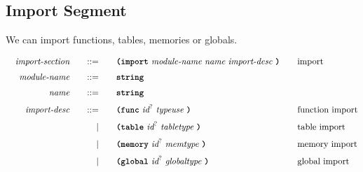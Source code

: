 \subsection{Import Segment}

We can import functions, tables, memories or globals.

\begin{alignat*}{9}
    && \textit{import-section}    &&\quad ::= &\quad && \textbf{\texttt{(import}}\ \textit{module-name}\ \textit{name}\ \textit{import-desc}\ \textbf{\texttt{)}}  \quad && \textrm{import} \\[1mm]
    && \textit{module-name}       &&\quad ::= &\quad && \textbf{\texttt{string}} &&\\[1mm]
    && \textit{name}              &&\quad ::= &\quad && \textbf{\texttt{string}} &&\\[1mm]
    && \textit{import-desc}       &&\quad ::= &\quad && \textbf{\texttt{(func}}\ \textit{id}^?\ \textit{typeuse}\ \textbf{\texttt{)}}  \quad && \textrm{function import} \\[1mm]
    &&                            &&\quad  |  &\quad && \textbf{\texttt{(table}}\ \textit{id}^?\ \textit{tabletype}\ \textbf{\texttt{)}}  \quad && \textrm{table import} \\[1mm]
    &&                            &&\quad  |  &\quad && \textbf{\texttt{(memory}}\ \textit{id}^?\ \textit{memtype}\ \textbf{\texttt{)}}  \quad && \textrm{memory import} \\[1mm]
    &&                            &&\quad  |  &\quad && \textbf{\texttt{(global}}\ \textit{id}^?\ \textit{globaltype}\ \textbf{\texttt{)}}  \quad && \textrm{global import} \\[1mm]
\end{alignat*}
